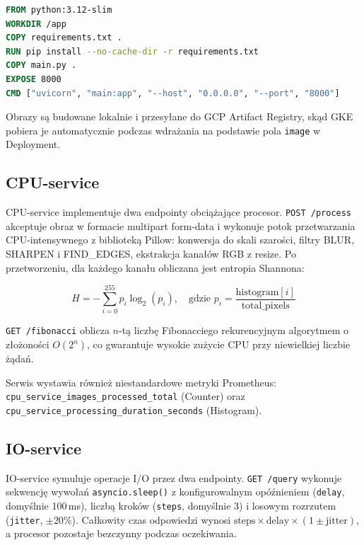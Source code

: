 \begin{lstlisting}[language=Dockerfile, caption={Dockerfile --- wzorzec wspólny dla wszystkich serwisów}, label={lst:dockerfile}]
FROM python:3.12-slim
WORKDIR /app
COPY requirements.txt .
RUN pip install --no-cache-dir -r requirements.txt
COPY main.py .
EXPOSE 8000
CMD ["uvicorn", "main:app", "--host", "0.0.0.0", "--port", "8000"]
\end{lstlisting}

Obrazy są budowane lokalnie i przesyłane do GCP Artifact Registry, skąd GKE pobiera je automatycznie podczas wdrażania na podstawie pola \texttt{image} w Deployment.

\subsection{CPU-service}

CPU-service implementuje dwa endpointy obciążające procesor. \texttt{POST /process} akceptuje obraz w formacie multipart form-data i wykonuje potok przetwarzania CPU-intensywnego z biblioteką Pillow: konwersja do skali szarości, filtry BLUR, SHARPEN i FIND\_EDGES, ekstrakcja kanałów RGB z resize. Po przetworzeniu, dla każdego kanału obliczana jest entropia Shannona:

\begin{equation}
  H = -\sum_{i=0}^{255} p_i \log_2(p_i), \quad \text{gdzie } p_i = \frac{\text{histogram}[i]}{\text{total\_pixels}}
\end{equation}

\texttt{GET /fibonacci} oblicza $n$-tą liczbę Fibonacciego rekurencyjnym algorytmem o złożoności $O(2^{n})$, co gwarantuje wysokie zużycie CPU przy niewielkiej liczbie żądań.



Serwis wystawia również niestandardowe metryki Prometheus: \texttt{cpu\_service\_images\_processed\_total} (Counter) oraz \texttt{cpu\_service\_processing\_duration\_seconds} (Histogram).

\subsection{IO-service}

IO-service symuluje operacje I/O przez dwa endpointy. \texttt{GET /query} wykonuje sekwencję wywołań \texttt{asyncio.sleep()} z konfigurowalnym opóźnieniem (\texttt{delay}, domyślnie 100\,ms), liczbą kroków (\texttt{steps}, domyślnie 3) i losowym rozrzutem (\texttt{jitter}, $\pm20\%$). Całkowity czas odpowiedzi wynosi $\text{steps} \times \text{delay} \times (1 \pm \text{jitter})$, a procesor pozostaje bezczynny podczas oczekiwania.

